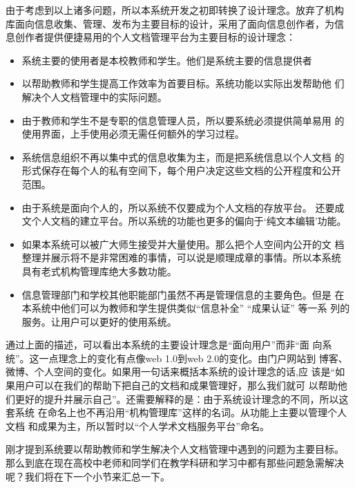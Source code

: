 由于考虑到以上诸多问题，所以本系统开发之初即转换了设计理念。放弃了机构
库面向信息收集、管理、发布为主要目标的设计，采用了面向信息创作者，为信
息创作者提供便捷易用的个人文档管理平台为主要目标的设计理念：
\begin{itemize}
\item 系统主要的使用者是本校教师和学生。他们是系统主要的信息提供者
\item 以帮助教师和学生提高工作效率为首要目标。系统功能以实际出发帮助他
  们解决个人文档管理中的实际问题。
\item 由于教师和学生不是专职的信息管理人员，所以要系统必须提供简单易用
  的使用界面，上手使用必须无需任何额外的学习过程。
\item 系统信息组织不再以集中式的信息收集为主，而是把系统信息以个人文档
  的形式保存在每个人的私有空间下，每个用户决定这些文档的公开程度和公开
  范围。
\item 由于系统是面向个人的，所以系统不仅要成为个人文档的存放平台。
  还要成文个人文档的建立平台。所以系统的功能也更多的偏向于‘纯文本编辑’功能。
\item 如果本系统可以被广大师生接受并大量使用。那么把个人空间内公开的文
  档整理并展示将不是非常困难的事情，可以说是顺理成章的事情。所以本系统
  具有老式机构管理库绝大多数功能。
\item 信息管理部门和学校其他职能部门虽然不再是管理信息的主要角色。但是
  在本系统中他们可以为教师和学生提供类似“信息补全” “成果认证” 等一系
  列的服务。让用户可以更好的使用系统。
\end{itemize}
通过上面的描述，可以看出本系统的主要设计理念是“面向用户”而非“面
向系统”。这一点理念上的变化有点像web 1.0到web 2.0的变化。由门户网站到
博客、微博、个人空间的变化。如果用一句话来概括本系统的设计理念的话,应
该是“如果用户可以在我们的帮助下把自己的文档和成果管理好，那么我们就可
以帮助他们更好的提升并展示自己”。还需要解释的是：由于系统设计理念的不同，所以这套系统
在命名上也不再沿用“机构管理库”这样的名词。从功能上主要以管理个人文档
和成果为主，所以暂时以“个人学术文档服务平台”命名。

刚才提到系统要以帮助教师和学生解决个人文档管理中遇到的问题为主要目标。
那么到底在现在高校中老师和同学们在教学科研和学习中都有那些问题急需解决
呢？我们将在下一个小节来汇总一下。
